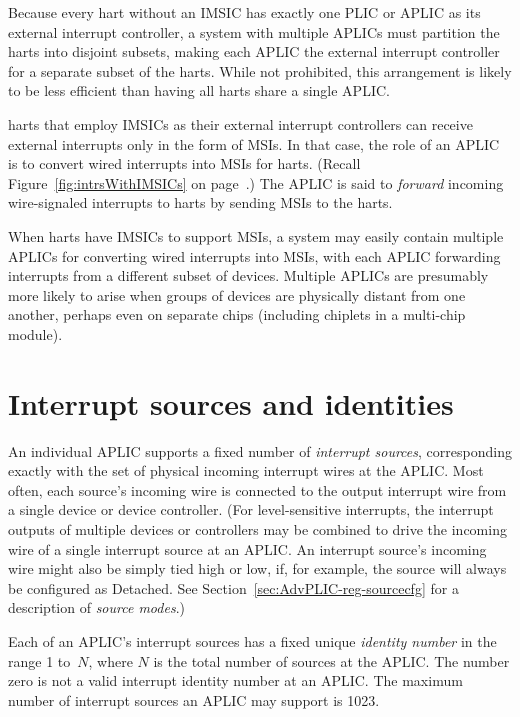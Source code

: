 \begin{commentary}
Because every {\RISCV} hart without an IMSIC has exactly one PLIC or APLIC
as its external interrupt controller, a system with multiple APLICs
must partition the harts into disjoint subsets, making each APLIC the
external interrupt controller for a separate subset of the harts.
While not prohibited, this arrangement is likely to be less efficient
than having all harts share a single APLIC.
\end{commentary}

{\RISCV} harts that employ IMSICs as their external interrupt
controllers can receive external interrupts only in the form of MSIs.
In that case, the role of an APLIC is to convert wired interrupts into
MSIs for harts.
(Recall Figure~\ref{fig:intrsWithIMSICs} on
page~\pageref{fig:intrsWithIMSICs}.)
The APLIC is said to \emph{forward} incoming wire-signaled interrupts to
harts by sending MSIs to the harts.

When harts have IMSICs to support MSIs, a system may easily contain
multiple APLICs for converting wired interrupts into MSIs, with each
APLIC forwarding interrupts from a different subset of devices.
Multiple APLICs are presumably more likely to arise when groups of
devices are physically distant from one another, perhaps even on
separate chips (including chiplets in a multi-chip module).

\section{Interrupt sources and identities}

An individual APLIC supports a fixed number of \emph{interrupt sources},
corresponding exactly with the set of physical incoming interrupt
wires at the APLIC.
Most often, each source's incoming wire is connected to the output
interrupt wire from a single device or device controller.
(For level-sensitive interrupts, the interrupt outputs of multiple
devices or controllers may be combined to drive the incoming wire of a
single interrupt source at an APLIC.
An interrupt source's incoming wire might also be simply tied high or
low, if, for example, the source will always be configured as Detached.
See Section~\ref{sec:AdvPLIC-reg-sourcecfg} for a description of
\emph{source modes}.)

Each of an APLIC's interrupt sources has a fixed unique
\emph{identity number} in the range 1 to~$N$, where $N$ is the total
number of sources at the APLIC.
The number zero is not a valid interrupt identity number at an APLIC.
The maximum number of interrupt sources an APLIC may support is
1023.

